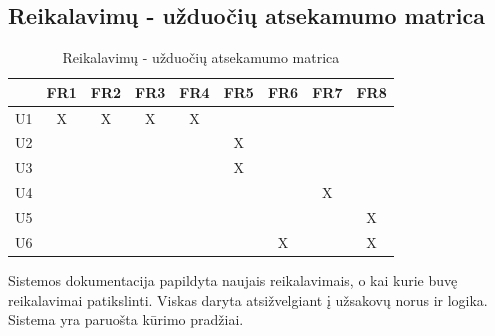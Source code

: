 \documentclass{VUMIFPSkursinis}
\begin{document}
\begin{enumerate}[label=\textbf{U\arabic*}.]
                \end{enumerate}
      
            \subsection{Reikalavimų - užduočių atsekamumo matrica}
            \begin{table}[H]\footnotesize
                \centering
                \caption{Reikalavimų - užduočių atsekamumo matrica}
                {
                    \begin{tabular}{|c|c|c|c|c|c|c|c|c| }
                    \hline
                        & FR1 & FR2 & FR3 & FR4 & FR5 & FR6 & FR7 & FR8 \\ 
                    \hline
                     U1 & X   & X   & X   & X   &     &     &     &      \\  
                    \hline
                     U2 &     &     &     &     & X   &     &     &      \\ 
                    \hline
                     U3 &     &     &     &     & X   &     &     &      \\ 
                    \hline
                     U4 &     &     &     &     &     &     & X   &      \\ 
                    \hline
                     U5 &     &     &     &     &     &     &     & X    \\ 
                    \hline
                     U6 &     &     &     &     &     & X   &     & X    \\ 
                    \hline 
                    \end{tabular}
                }
            \end{table}

			Sistemos dokumentacija papildyta naujais reikalavimais, o kai kurie buvę reikalavimai patikslinti. Viskas daryta atsižvelgiant į užsakovų norus ir logika. Sistema yra paruošta kūrimo pradžiai.
    
        \appendix  %
      
    
\end{document}
